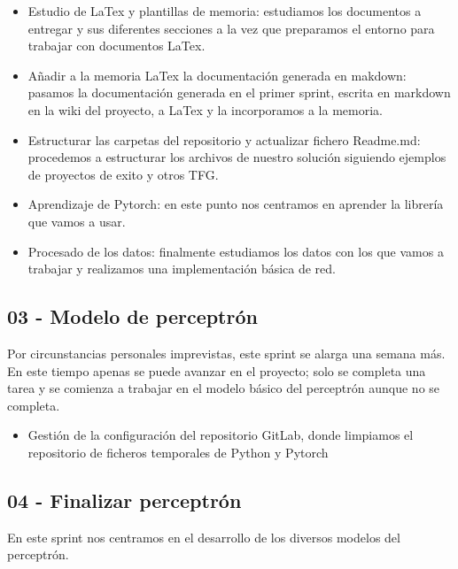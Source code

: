 \begin{itemize}
    \item Estudio de LaTex y plantillas de memoria: estudiamos los documentos a entregar y sus diferentes secciones a la vez que preparamos el entorno para trabajar con documentos LaTex.
    \item Añadir a la memoria LaTex la documentación generada en makdown: pasamos la documentación generada en el primer sprint, escrita en markdown en la wiki del proyecto, a LaTex y la incorporamos a la memoria.
    \item Estructurar las carpetas del repositorio y actualizar fichero Readme.md: procedemos a estructurar los archivos de nuestro solución siguiendo ejemplos de proyectos de exito y otros TFG.
    \item Aprendizaje de Pytorch: en este punto nos centramos en aprender la librería que vamos a usar.
    \item Procesado de los datos: finalmente estudiamos los datos con los que vamos a trabajar y realizamos una implementación básica de red.
\end{itemize}


\subsection{03 - Modelo de perceptrón \newline
[16/03/2020 - 06/04/2020]}

Por circunstancias personales imprevistas, este sprint se alarga una semana más. En este tiempo apenas se puede avanzar en el proyecto; solo se completa una tarea y se comienza a trabajar en el modelo básico del perceptrón aunque no se completa.

\begin{itemize}
    \item Gestión de la configuración del repositorio GitLab, donde limpiamos el repositorio de ficheros temporales de Python y Pytorch
\end{itemize}


\subsection{04 - Finalizar perceptrón \newline
[07/04/2020 - 20/04/2020]}

En este sprint nos centramos en el desarrollo de los diversos modelos del perceptrón.

